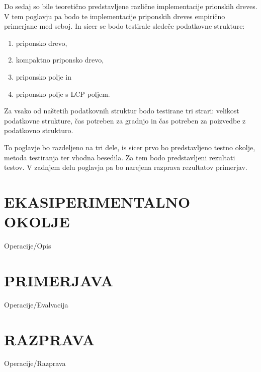 Do sedaj so bile teoretično predstavljene različne implementacije prionskih dreves. V tem poglavju pa bodo te implementacije priponskih dreves empirično primerjane med seboj. In sicer se bodo testirale sledeče podatkovne strukture:
\begin{enumerate}
        \item priponsko drevo, %
        \item kompaktno priponsko drevo, 
        \item priponsko polje in 
        \item priponsko polje s LCP poljem.
\end{enumerate}
Za vsako od naštetih podatkovnih struktur bodo testirane tri strari: velikost podatkovne strukture, čas potreben za gradnjo in čas potreben za poizvedbe z podatkovno strukturo.

To poglavje bo razdeljeno na tri dele, is sicer prvo bo predstavljeno testno okolje, metoda testiranja ter vhodna besedila. Za tem bodo predstavljeni rezultati testov. V zadnjem delu poglavja pa bo narejena razprava rezultatov primerjav.




\section{EKASIPERIMENTALNO OKOLJE}\label{sec:opis}
{Operacije/Opis}


\section{PRIMERJAVA}\label{sec:primerjava}
{Operacije/Evalvacija}

\section{RAZPRAVA}\label{sec:razprava}
{Operacije/Razprava}